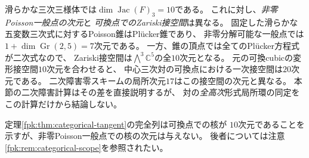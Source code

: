 \begin{remark}[モジュライの局所次元と接空間]
\label{fpk:rem:moduli}
滑らかな三次三様体では$\dim\operatorname{Jac}(F)_3=10$である。
これに対し、\emph{非零Poisson一般点の次元}と
\emph{可換点でのZariski接空間}は異なる。
固定した滑らかな五変数三次式に対するPoisson錐はPl\"ucker錐であり、
非零分解可能な一般点では$1+\dim\operatorname{Gr}(2,5)=7$次元である。
一方、錐の頂点では全てのPl\"ucker方程式が二次式なので、
Zariski接空間は$\bigwedge^3\mathbb C^5$の全$10$次元となる。
元の可換cubicの変形接空間$10$次元を合わせると、
中心三次対の可換点における一次接空間は$20$次元である。
二次障害零スキームの局所次元$17$はこの接空間の次元と異なる。
本節の二次障害計算はその差を直接説明するが、
対の\emph{全高次}形式局所環の同定をこの計算だけから結論しない。

定理\ref{fpk:thm:categorical-tangent}の完全列は可換点での核が
$10$次元であることを示すが、非零Poisson一般点での核の次元は与えない。
後者については注意\ref{fpk:rem:categorical-scope}を参照されたい。
\end{remark}
